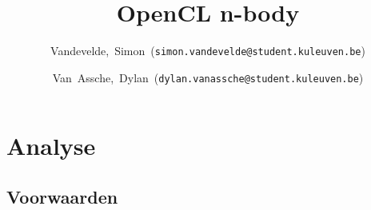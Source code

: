 \documentclass{article}
\title{OpenCL n-body}
\author{Vandevelde,~Simon~(\texttt{simon.vandevelde@student.kuleuven.be})
  \and
  Van~Assche,~Dylan~(\texttt{dylan.vanassche@student.kuleuven.be})}
\begin{document}
\maketitle %


\section{Analyse}
\subsection{Voorwaarden}

\end{document}

